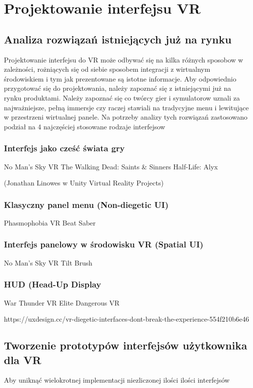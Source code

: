 \chapter{Projektowanie interfejsu VR}


\section{Analiza rozwiązań istniejących już na rynku}
Projektowanie interfejsu do VR może odbywać się na kilka różnych sposobow w zależności, rożniących się od siebie sposobem integracji z wirtualnym środowiskiem i tym jak prezentowane są istotne informacje. Aby odpowiednio przygotować się do projektowania, należy zapoznać się z istniejącymi już na rynku produktami. Należy zapoznać się co twórcy gier i symulatorow uznali za najważniejsze, pełną immersje czy raczej stawiali na tradycyjne menu i lewitujące w przestrzeni wirtualnej panele. Na potrzeby analizy tych rozwiązań zastosowano podział na 4 najczęściej stosowane rodzaje interfejsow

\subsection{Interfejs jako cześć świata gry}


No Man’s Sky VR
The Walking Dead: Saints & Sinners
Half-Life: Alyx

(Jonathan Linowes w Unity Virtual Reality Projects)



\subsection{Klasyczny panel menu (Non-diegetic UI)}
Phasmophobia VR
Beat Saber

\subsection{Interfejs panelowy w środowisku VR (Spatial UI)}
No Man’s Sky VR
Tilt Brush 

\subsection{HUD (Head-Up Display}
War Thunder VR
Elite Dangerous VR

https://uxdesign.cc/vr-diegetic-interfaces-dont-break-the-experience-554f210b6e46


\section{Tworzenie prototypów interfejsów użytkownika dla VR}
Aby uniknąć wielokrotnej implementacji niezliczonej ilości ilości interfejsów 
